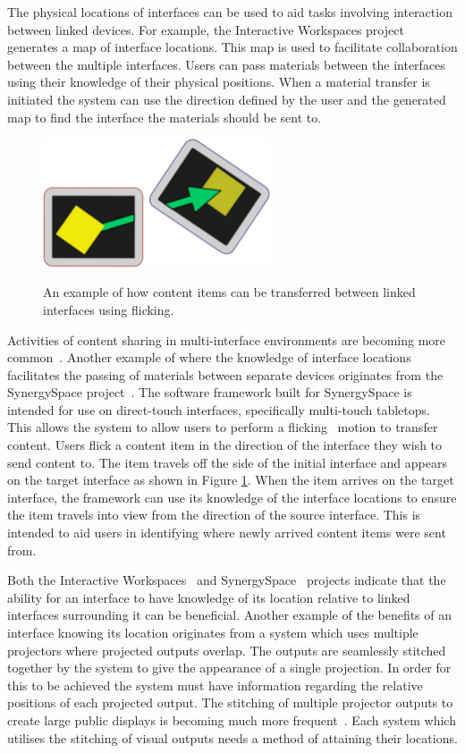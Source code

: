 \documentclass{bmcart}
\begin{document}
The physical locations of interfaces can be used to aid tasks involving interaction between linked devices.
For example, the Interactive Workspaces project~\cite{Johanson2002} generates a map of interface locations.
This map is used to facilitate collaboration between the multiple interfaces.
Users can pass materials between the interfaces using their knowledge of their physical positions.
When a material transfer is initiated the system can use the direction defined by the user and the generated map to find the interface the materials should be sent to.

\begin{figure}[h!]
   \centering
   \caption{An example of how content items can be transferred between linked interfaces using flicking.}
   \includegraphics[width=0.6\textwidth]{figures/flicking.png}
   \label{fig:flick}
\end{figure}

Activities of content sharing in multi-interface environments are becoming more common~\cite{Nacenta2009}.
Another example of where the knowledge of interface locations facilitates the passing of materials between separate devices originates from the SynergySpace project~\cite{Burd2009}.
The software framework built for SynergySpace is intended for use on direct-touch interfaces, specifically multi-touch tabletops.
This allows the system to allow users to perform a flicking~\cite{Reetz2006} motion to transfer content.
Users flick a content item in the direction of the interface they wish to send content to.
The item travels off the side of the initial interface and appears on the target interface as shown in Figure \ref{fig:flick}.
When the item arrives on the target interface, the framework can use its knowledge of the interface locations to ensure the item travels into view from the direction of the source interface.
This is intended to aid users in identifying where newly arrived content items were sent from.

Both the Interactive Workspaces~\cite{Johanson2002} and SynergySpace~\cite{Burd2009} projects indicate that the ability for an interface to have knowledge of its location relative to linked interfaces surrounding it can be beneficial.
Another example of the benefits of an interface knowing its location originates from a system which uses multiple projectors where projected outputs overlap.
The outputs are seamlessly stitched together by the system to give the appearance of a single projection.
In order for this to be achieved the system must have information regarding the relative positions of each projected output.
The stitching of multiple projector outputs to create large public displays is becoming much more frequent~\cite{Jones2011}.
Each system which utilises the stitching of visual outputs needs a method of attaining their locations.
\end{document}
